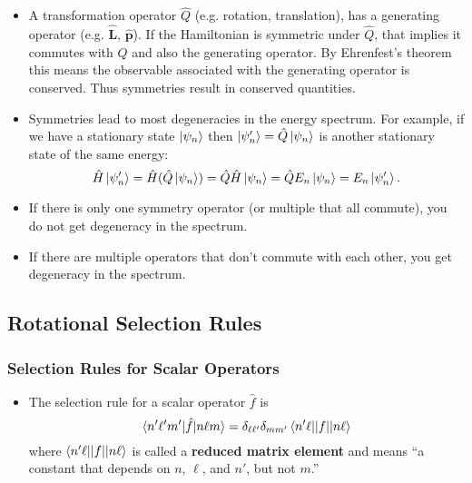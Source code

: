 \documentclass{article}
\renewcommand{\vec}[1]{\boldsymbol{\mathbf{#1}}}
\newcommand{\uvec}[1]{\hat{\vec{#1}}}
\begin{document}
\begin{itemize}
  \item A transformation operator $\hat{Q}$ (e.g. rotation, translation), has a generating operator (e.g. $\uvec{L}$, $\uvec{p}$). If the Hamiltonian is symmetric under $\hat{Q}$, that implies it commutes with $\hat{Q}$ and also the generating operator. By Ehrenfest's theorem this means the observable associated with the generating operator is conserved. Thus symmetries result in conserved quantities.

  \item Symmetries lead to most degeneracies in the energy spectrum. For example, if we have a stationary state $\ket{\psi_n}$ then $\ket{\psi_n'} = \hat{Q} \ket{\psi_n}$ is another stationary state of the same energy: \[\hat{H} \ket{\psi_n'} = \hat{H} (\hat{Q} \ket{\psi_n}) = \hat{Q} \hat{H} \ket{\psi_n} = \hat{Q} E_n \ket{\psi_n} = E_n \ket{\psi_n'}.\]

  \item If there is only one symmetry operator (or multiple that all commute), you do not get degeneracy in the spectrum.

  \item If there are multiple operators that don't commute with each other, you get degeneracy in the spectrum.
\end{itemize}

\subsection{Rotational Selection Rules}

\subsubsection{Selection Rules for Scalar Operators}

\begin{itemize}
  \item The selection rule for a scalar operator $\hat{f}$ is \[\braket{n' \ell' m' | \hat{f} | n \ell m} = \delta_{\ell \ell'} \delta_{m m'} \braket{n' \ell || f || n \ell}\] where $\braket{n' \ell || f || n \ell}$ is called a \textbf{reduced matrix element} and means ``a constant that depends on $n$, $\ell$, and $n'$, but not $m$.''
\end{itemize}
\end{document}
